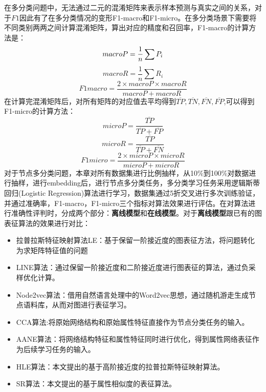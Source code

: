 在多分类问题中，无法通过二元的混淆矩阵来表示样本预测与真实之间的关系，对于$F1$因此有了在多分类情况的变形F1-macro和F1-micro。在多分类场景下需要将不同类别两两之间计算混淆矩阵，算出对应的精度和召回率，F1-macro的计算方法是：
\begin{equation}
	macro\-P = \frac{1}{n}\sum P_i
\end{equation}
\begin{equation}
macroR = \frac{1}{n}\sum R_i
\end{equation}
\begin{equation}
F1macro = \frac{2\times macroP\times macroR}{macroP+macroR}
\end{equation}
在计算完混淆矩阵后，对所有矩阵的对应值去平均得到$\overline{TP}, \overline{TN}, \overline{FN},\overline{FP}$,可以得到F1-micro的计算方法：
\begin{equation}
microP = \frac{\overline{TP}}{\overline{TP}+\overline{FP}}
\end{equation}
\begin{equation}
microR = \frac{\overline{TP}}{\overline{TP}+\overline{FN}}
\end{equation}
\begin{equation}
F1micro = \frac{2\times microP\times microR}{microP+microR}
\end{equation}
对于节点多分类问题，本章对所有数据集进行比例抽样，从10\%到100\%对数据进行抽样，进行embedding后，进行节点多分类任务，多分类学习任务采用逻辑斯蒂回归(Logistic Regression)算法进行学习，数据集通过5折交叉进行多次训练验证，并通过准确率，F1-macro，F1-micro三个指标对算法效果进行评估。在对算法进行准确性评判时，分成两个部分：\textbf{离线模型}和\textbf{在线模型}。对于\textbf{离线模型}跟已有的图表征算法的效果进行对比：
\begin{itemize}
	\item 拉普拉斯特征映射算法LE：基于保留一阶接近度的图表征方法，将问题转化为求矩阵特征值的问题
	\item LINE算法：通过保留一阶接近度和二阶接近度进行图表征的算法，通过负采样优化计算。
	\item Node2vec算法：借用自然语言处理中的Word2vec思想，通过随机游走生成节点语料库，从而对图进行表征学习。
	\item CCA算法\cite{hardoon2004canonical}:将原始网络结构和原始属性特征直接作为节点分类任务的输入。
	\item AANE算法\cite{huang2017label}：将网络结构特征和属性特征同时进行优化，得到属性网络表征作为后续学习任务的输入。
	\item HLE算法：本文提出的基于高阶接近度的拉普拉斯特征映射算法。
	\item SR算法：本文提出的基于属性相似度的表征算法。
\end{itemize}
